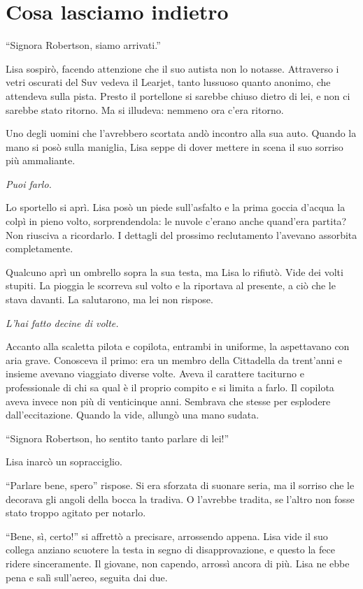 \chapter{Cosa lasciamo indietro}
\label{ch:cosa-lasciamo-indietro}

``Signora Robertson, siamo arrivati.''

Lisa sospirò, facendo attenzione che il suo autista non lo notasse. Attraverso i vetri oscurati del
Suv vedeva il Learjet, tanto lussuoso quanto anonimo, che attendeva sulla pista. Presto il
portellone si sarebbe chiuso dietro di lei, e non ci sarebbe stato ritorno. Ma si illudeva: nemmeno
ora c'era ritorno.

Uno degli uomini che l'avrebbero scortata andò incontro alla sua auto. Quando la mano si posò sulla
maniglia, Lisa seppe di dover mettere in scena il suo sorriso più ammaliante.

\emph{Puoi farlo.}

Lo sportello si aprì. Lisa posò un piede sull'asfalto e la prima goccia d'acqua la colpì in pieno
volto, sorprendendola: le nuvole c'erano anche quand'era partita? Non riusciva a ricordarlo. I
dettagli del prossimo reclutamento l'avevano assorbita completamente.

Qualcuno aprì un ombrello sopra la sua testa, ma Lisa lo rifiutò. Vide dei volti stupiti. La pioggia
le scorreva sul volto e la riportava al presente, a ciò che le stava davanti. La salutarono, ma lei
non rispose.

\emph{L'hai fatto decine di volte.}

Accanto alla scaletta pilota e copilota, entrambi in uniforme, la aspettavano con aria grave.
Conosceva il primo: era un membro della Cittadella da trent'anni e insieme avevano viaggiato diverse
volte. Aveva il carattere taciturno e professionale di chi sa qual è il proprio compito e si limita
a farlo. Il copilota aveva invece non più di venticinque anni. Sembrava che stesse per esplodere
dall'eccitazione. Quando la vide, allungò una mano sudata.

``Signora Robertson, ho sentito tanto parlare di lei!''

Lisa inarcò un sopracciglio.

``Parlare bene, spero'' rispose. Si era sforzata di suonare seria, ma il sorriso che le decorava gli
angoli della bocca la tradiva. O l'avrebbe tradita, se l'altro non fosse stato troppo agitato per
notarlo.

``Bene, sì, certo!'' si affrettò a precisare, arrossendo appena. Lisa vide il suo collega anziano
scuotere la testa in segno di disapprovazione, e questo la fece ridere sinceramente. Il giovane, non
capendo, arrossì ancora di più. Lisa ne ebbe pena e salì sull'aereo, seguita dai due.


